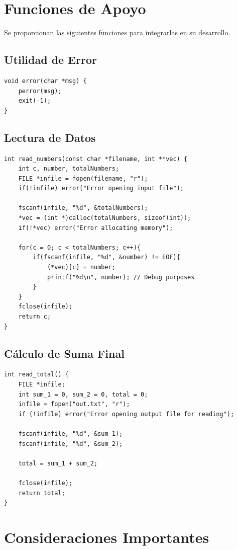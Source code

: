 \documentclass[12pt,a4paper]{article}
\begin{document}
\section*{Funciones de Apoyo}
Se proporcionan las siguientes funciones para integrarlas en su desarrollo.

\subsection*{Utilidad de Error}
\begin{lstlisting}
void error(char *msg) {
    perror(msg);
    exit(-1);
}
\end{lstlisting}

\subsection*{Lectura de Datos}
\begin{lstlisting}
int read_numbers(const char *filename, int **vec) {
    int c, number, totalNumbers;
    FILE *infile = fopen(filename, "r");
    if(!infile) error("Error opening input file");
    
    fscanf(infile, "%d", &totalNumbers);
    *vec = (int *)calloc(totalNumbers, sizeof(int));
    if(!*vec) error("Error allocating memory");
    
    for(c = 0; c < totalNumbers; c++){
        if(fscanf(infile, "%d", &number) != EOF){
            (*vec)[c] = number;
            printf("%d\n", number); // Debug purposes
        }
    }
    fclose(infile);
    return c;
}
\end{lstlisting}

\newpage

\subsection*{Cálculo de Suma Final}
\begin{lstlisting}
int read_total() {
    FILE *infile;
    int sum_1 = 0, sum_2 = 0, total = 0;
    infile = fopen("out.txt", "r");
    if (!infile) error("Error opening output file for reading");
    
    fscanf(infile, "%d", &sum_1);
    fscanf(infile, "%d", &sum_2);

    total = sum_1 + sum_2;
    
    fclose(infile);
    return total;
}
\end{lstlisting}

\section*{Consideraciones Importantes}
\end{document}
